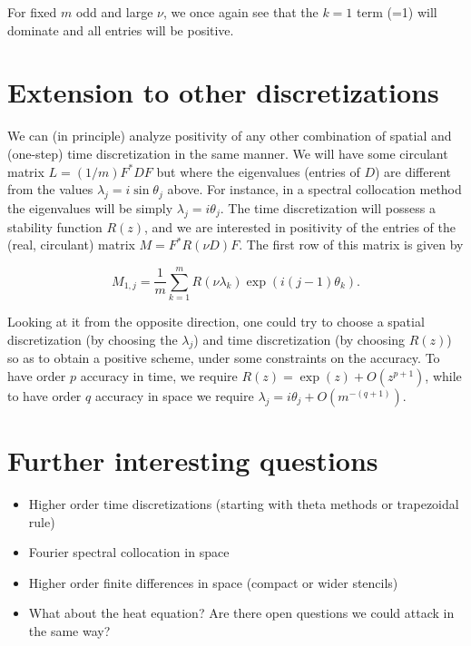 \documentclass[a4paper]{article}
\begin{document}
For fixed $m$ odd and large $\nu$, we once again see that the $k=1$ term (=1)
will dominate and all entries will be positive.

\section{Extension to other discretizations}
We can (in principle) analyze positivity of any other combination of spatial and (one-step) time discretization in the same manner.  We
will have some circulant matrix $L = (1/m) F^* D F$ but where
the eigenvalues (entries of $D$) are different from the values
$\lambda_j = i\sin \theta_j$ above.  For instance, in a spectral collocation
method the eigenvalues will be simply $\lambda_j = i \theta_j$.  The time
discretization will possess a stability function $R(z)$, and
we are interested in positivity of the entries of the (real, circulant)
matrix $M=F^* R(\nu D) F$.  The first row of this matrix is given by

$$M_{1,j} = \frac{1}{m} \sum_{k=1}^m R(\nu\lambda_k) \exp(i(j-1)\theta_k).$$

Looking at it from the opposite direction, one could try to choose a spatial
discretization (by choosing the $\lambda_j$) and time discretization
(by choosing $R(z)$) so as to obtain a positive scheme, under some constraints on the accuracy.  To have order $p$ accuracy in time,
we require $R(z) = \exp(z) + O(z^{p+1})$, while to have order $q$
accuracy in space we require $\lambda_j = i \theta_j + O(m^{-(q+1)}).$

\section{Further interesting questions}
\begin{itemize}
  \item Higher order time discretizations (starting with theta methods or trapezoidal rule)
  \item Fourier spectral collocation in space
  \item Higher order finite differences in space (compact or wider stencils)
  \item What about the heat equation?  Are there open questions we could attack in the same way?
\end{itemize}
\end{document}
